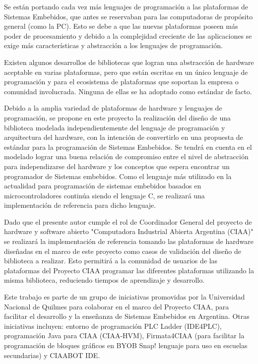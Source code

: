 Se están portando cada vez más lenguajes de programación a las plataformas de Sistemas Embebidos, que antes se reservaban para las computadoras de propósito general (como la PC).
Esto se debe a que las nuevas plataformas poseen más poder de procesamiento y debido a la complejidad creciente de las aplicaciones se exige más características y abstracción a los lenguajes de programación.

Existen algunos desarrollos de bibliotecas que logran una abstracción de hardware aceptable en varias plataformas, pero que están escritas en un único lenguaje de programación y para el ecosistema de plataformas que soportan la empresa o comunidad involucrada. Ninguna de ellas se ha adoptado como estándar de facto.





Debido a la amplia variedad de plataformas de hardware y lenguajes de programación, se propone en este proyecto la realización del diseño de una biblioteca modelada independientemente del lenguaje de programación y arquitectura del hardware, con la intención de convertirlo en una propuesta de estándar para la programación de Sistemas Embebidos. Se tendrá en cuenta en el modelado lograr una buena relación de compromiso entre el nivel de abstracción para independizarse del hardware y los conceptos que espera encontrar un programador de Sistemas embebidos.
Como el lenguaje más utilizado en la actualidad para programación de sistemas embebidos basados en microcontroladores continúa siendo el lenguaje C, se realizará una implementación de referencia para dicho lenguaje.

Dado que el presente autor cumple el rol de Coordinador General del proyecto de hardware y software abierto "Computadora Industrial Abierta Argentina (CIAA)" se realizará la implementación de referencia tomando las plataformas de hardware diseñadas en el marco de este proyecto como casos de validación del diseño de biblioteca a realizar. Esto permitirá a la comunidad de usuarios de las plataformas del Proyecto CIAA programar las diferentes plataformas utilizando la misma biblioteca, reduciendo tiempos de aprendizaje y desarrollo.

Este trabajo es parte de un grupo de iniciativas promovidas por la Universidad Nacional de Quilmes para colaborar en el marco del Proyecto CIAA, para facilitar el desarrollo y la enseñanza de Sistemas Embebidos en Argentina. Otras iniciativas incluyen: entorno de programación PLC Ladder (IDE4PLC), programación Java para CIAA (CIAA-HVM), Firmata4CIAA (para facilitar la programación de bloques gráficos en BYOB Snap! lenguaje para uso en escuelas secundarias) y CIAABOT IDE.






